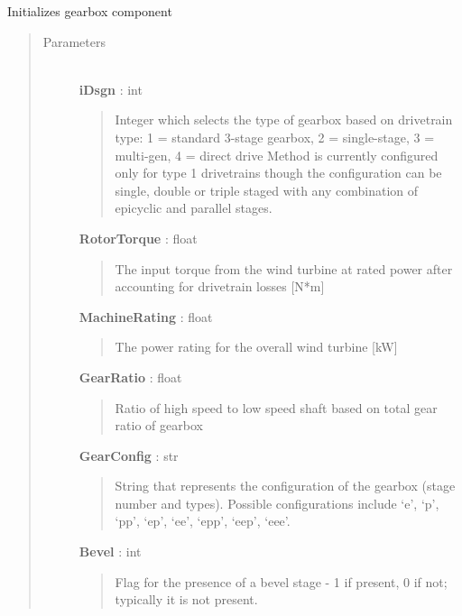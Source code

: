 \documentclass[letterpaper,10pt,openany,oneside]{sphinxmanual}
\begin{document}
\begin{fulllineitems}
\label{documentation:nacelleSE.src.nacelle_components.Gearbox}
Initializes gearbox component
\begin{quote}\begin{description}
\item[{Parameters }] \leavevmode\\
\textbf{iDsgn} : int
\begin{quote}

Integer which selects the type of gearbox based on drivetrain type: 1 = standard 3-stage gearbox, 2 = single-stage, 3 = multi-gen, 4 = direct drive
Method is currently configured only for type 1 drivetrains though the configuration can be single, double or triple staged with any combination of epicyclic and parallel stages.
\end{quote}

\textbf{RotorTorque} : float
\begin{quote}

The input torque from the wind turbine at rated power after accounting for drivetrain losses {[}N*m{]}
\end{quote}

\textbf{MachineRating} : float
\begin{quote}

The power rating for the overall wind turbine {[}kW{]}
\end{quote}

\textbf{GearRatio} : float
\begin{quote}

Ratio of high speed to low speed shaft based on total gear ratio of gearbox
\end{quote}

\textbf{GearConfig} : str
\begin{quote}

String that represents the configuration of the gearbox (stage number and types).
Possible configurations include `e', `p', `pp', `ep', `ee', `epp', `eep', `eee'.
\end{quote}

\textbf{Bevel} : int
\begin{quote}

Flag for the presence of a bevel stage - 1 if present, 0 if not; typically it is not present.
\end{quote}


\end{description}
\end{quote}
\end{fulllineitems}
\end{document}
